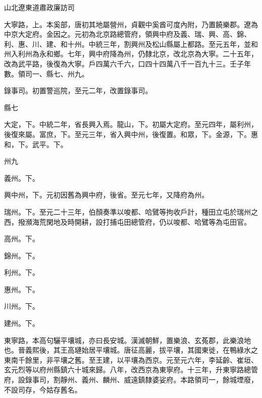 \begin{pinyinscope}
 山北遼東道肅政廉訪司



 大寧路，上。本奚部，唐初其地屬營州，貞觀中奚酋可度內附，乃置饒樂郡。遼為中京大定府。金因之。元初為北京路總管府，領興中府及義、瑞、興、高、錦、利、惠、川、建、和十州。中統三年，割興州及松山縣屬上都路。至元五年，並和州入利州為永和鄉。七年，興中府降為州，仍隸北京，改北京為大寧。二十五年，改為武平路，後復為大寧。戶四萬六千六，口四十四萬八千一百九十三。壬子年數。領司一、縣七、州九。



 錄事司。初置警巡院，至元二年，改置錄事司。



 縣七



 大定，下。中統二年，省長興入焉。龍山，下。初屬大定府。至元四年，屬利州，後復來屬。富庶，下。至元三年，省入興中州，後復置。和眾，下。金源，下。惠和，下。武平。下。



 州九



 義州。下。



 興中州，下。元初因舊為興中府，後省。至元七年，又降府為州。



 瑞州。下。至元二十三年，伯顏奏準以唆都、哈鷿等拘收戶計，種田立屯於瑞州之西，撥瀕海荒閑地及時開耕，設打捕屯田總管府，仍以唆都、哈鷿等為屯田官。



 高州。下。



 錦州。下。



 利州。下。



 惠州。下。



 川州。下。



 建州。下。



 東寧路，本高句驪平壤城，亦曰長安城。漢滅朝鮮，置樂浪、玄菟郡，此樂浪地也。晉義熙後，其王高璉始居平壤城。唐征高麗，拔平壤，其國東徙，在鴨綠水之東南千餘里，非平壤之舊。至王建，以平壤為西京。元至元六年，李延齡、崔垣、玄元烈等以府州縣鎮六十城來歸。八年，改西京為東寧府。十三年，升東寧路總管府，設錄事司，割靜州、義州、麟州、威遠鎮隸婆娑府。本路領司一，餘城堙廢，不設司存，今姑存舊名。




\end{pinyinscope}
